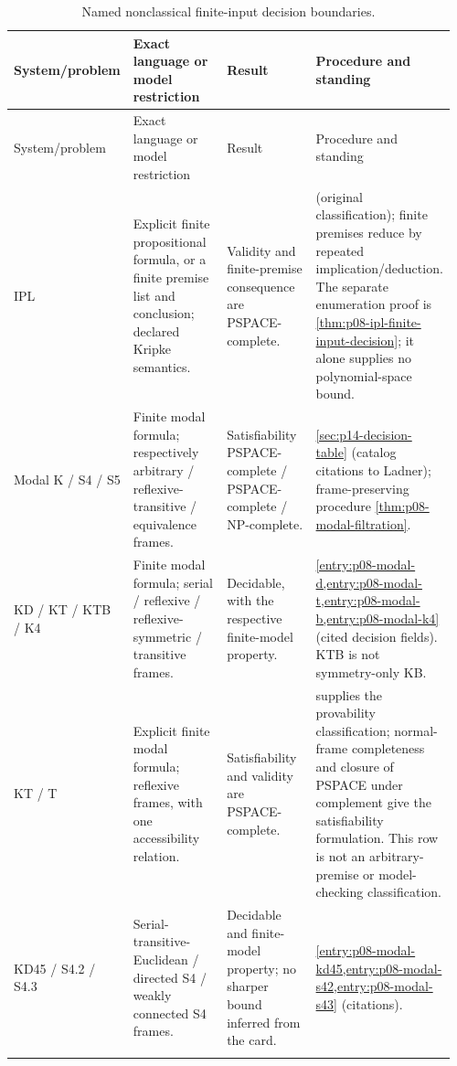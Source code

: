 \begin{landscape}
\begingroup\small\setlength{\tabcolsep}{3pt}
\begin{longtable}{@{}p{0.19\linewidth}p{0.27\linewidth}p{0.25\linewidth}p{0.25\linewidth}@{}}
\caption{Named nonclassical finite-input decision boundaries.}\label{tab:p14-dc-nonclassical}\\
\toprule
System/problem & Exact language or model restriction & Result & Procedure and standing\\\midrule
\endfirsthead
\toprule
System/problem & Exact language or model restriction & Result & Procedure and standing\\\midrule
\endhead
\bottomrule
\endfoot
IPL & Explicit finite propositional formula, or a finite premise list and conclusion; declared Kripke semantics. & Validity and finite-premise consequence are PSPACE-complete. & \cite{Statman1979} (original classification); finite premises reduce by repeated implication/deduction. The separate enumeration proof is \cref{thm:p08-ipl-finite-input-decision}; it alone supplies no polynomial-space bound.\\\addlinespace
Modal K / S4 / S5 & Finite modal formula; respectively arbitrary / reflexive-transitive / equivalence frames. & Satisfiability PSPACE-complete / PSPACE-complete / NP-complete. & \cref{sec:p14-decision-table} (catalog citations to Ladner); frame-preserving procedure \cref{thm:p08-modal-filtration}.\\\addlinespace
KD / KT / KTB / K4 & Finite modal formula; serial / reflexive / reflexive-symmetric / transitive frames. & Decidable, with the respective finite-model property. & \cref{entry:p08-modal-d,entry:p08-modal-t,entry:p08-modal-b,entry:p08-modal-k4} (cited decision fields). KTB is not symmetry-only KB.\\\addlinespace
KT / T & Explicit finite modal formula; reflexive frames, with one accessibility relation. & Satisfiability and validity are PSPACE-complete. & \cite{Ladner1977} supplies the provability classification; normal-frame completeness and closure of PSPACE under complement give the satisfiability formulation. This row is not an arbitrary-premise or model-checking classification.\\\addlinespace
KD45 / S4.2 / S4.3 & Serial-transitive-Euclidean / directed S4 / weakly connected S4 frames. & Decidable and finite-model property; no sharper bound inferred from the card. & \cref{entry:p08-modal-kd45,entry:p08-modal-s42,entry:p08-modal-s43} (citations).\\\addlinespace

\end{longtable}
\end{landscape}
